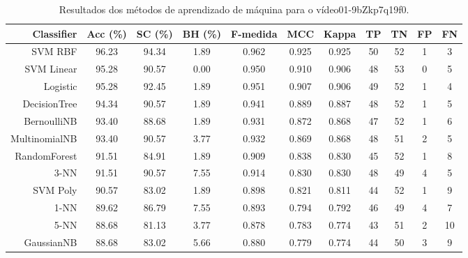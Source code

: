 \begin{table}[!htb]
\centering
\caption{Resultados dos métodos de aprendizado de máquina para o vídeo01-9bZkp7q19f0.}
\label{tab:01-9bZkp7q19f0}
\begin{tabular}{r|c|c|c|c|c|c|c|c|c|c}
\hline\hline
Classifier & Acc (\%) & SC (\%) & BH (\%) & F-medida & MCC & Kappa & TP & TN & FP & FN \\ \hline
SVM RBF & 96.23 & 94.34 & 1.89 & 0.962 & 0.925 & 0.925 & 50 & 52 & 1 & 3 \\ 
SVM Linear & 95.28 & 90.57 & 0.00 & 0.950 & 0.910 & 0.906 & 48 & 53 & 0 & 5 \\ 
Logistic & 95.28 & 92.45 & 1.89 & 0.951 & 0.907 & 0.906 & 49 & 52 & 1 & 4 \\ 
DecisionTree & 94.34 & 90.57 & 1.89 & 0.941 & 0.889 & 0.887 & 48 & 52 & 1 & 5 \\ 
BernoulliNB & 93.40 & 88.68 & 1.89 & 0.931 & 0.872 & 0.868 & 47 & 52 & 1 & 6 \\ 
MultinomialNB & 93.40 & 90.57 & 3.77 & 0.932 & 0.869 & 0.868 & 48 & 51 & 2 & 5 \\ 
RandomForest & 91.51 & 84.91 & 1.89 & 0.909 & 0.838 & 0.830 & 45 & 52 & 1 & 8 \\ 
3-NN & 91.51 & 90.57 & 7.55 & 0.914 & 0.830 & 0.830 & 48 & 49 & 4 & 5 \\ 
SVM Poly & 90.57 & 83.02 & 1.89 & 0.898 & 0.821 & 0.811 & 44 & 52 & 1 & 9 \\ 
1-NN & 89.62 & 86.79 & 7.55 & 0.893 & 0.794 & 0.792 & 46 & 49 & 4 & 7 \\ 
5-NN & 88.68 & 81.13 & 3.77 & 0.878 & 0.783 & 0.774 & 43 & 51 & 2 & 10 \\ 
GaussianNB & 88.68 & 83.02 & 5.66 & 0.880 & 0.779 & 0.774 & 44 & 50 & 3 & 9 \\ 
\hline\hline
\end{tabular}
\end{table}
